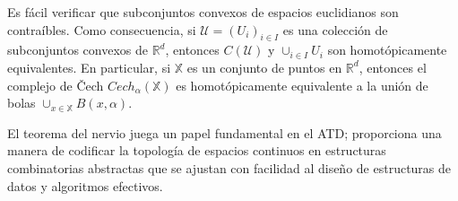 Es f\'acil verificar que subconjuntos convexos de espacios euclidianos son contra\'ibles. Como
consecuencia, si $\mathcal{U} = \left(U_{i}\right)_{i\in I}$ es una colecci\'on de subconjuntos convexos
de $\mathbb{R}^{d}$, entonces $C\left(\mathcal{U}\right)$ y $\cup_{i\in I}U_{i}$ son homot\'opicamente
equivalentes. En particular, si $\mathbb{X}$ es un conjunto de puntos en $\mathbb{R}^{d}$, entonces el
complejo de \v Cech $Cech_{\alpha}\left(\mathbb{X}\right)$ es homot\'opicamente equivalente a la uni\'on
de bolas $\cup_{x\in\mathbb{X}}B\left(x, \alpha\right)$.

El teorema del nervio juega un papel fundamental en el ATD; proporciona una manera de codificar la
topolog\'ia de espacios continuos en estructuras combinatorias abstractas que se ajustan con facilidad
al dise\~{n}o de estructuras de datos y algoritmos efectivos.